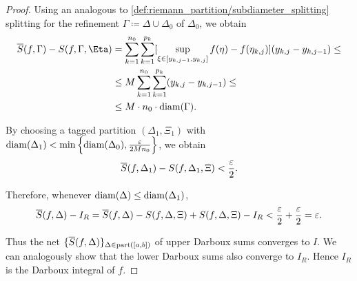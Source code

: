 \begin{proof}
  Using an analogous to \eqref{def:riemann_partition/subdiameter_splitting} splitting for the refinement \( \Gamma \coloneqq \Delta \cup \Delta_0 \) of \( \Delta_0 \), we obtain
  \begin{align*}
    \Ol{S}(f, \Gamma) - S(f, \Gamma, \Eta)
    &=
    \sum_{k=1}^{n_0} \sum_{k=1}^{p_k} [ \sup_{\xi \in [y_{k,j-1}, y_{k,j}]} f(\eta) - f(\eta_{k,j}) ] (y_{k,j} - y_{k,j-1})
    \leq \\ &\leq
    M \sum_{k=1}^{n_0} \sum_{k=1}^{p_k} (y_{k,j} - y_{k,j-1})
    \leq \\ &\leq
    M \cdot n_0 \cdot \Diam(\Gamma).
  \end{align*}

  By choosing a tagged partition \( (\Delta_1, \Xi_1) \) with \( \operatorname{diam}(\Delta_1) < \min \left\{ \operatorname{diam}(\Delta_0), \frac \varepsilon {2 M n_0} \right\} \), we obtain
  \begin{equation*}
    \overline{S}(f, \Delta_1) - S(f, \Delta_1, \Xi) < \frac \varepsilon 2.
  \end{equation*}

  Therefore, whenever \( \operatorname{diam}(\Delta) \leq \operatorname{diam}(\Delta_1) \),
  \begin{equation*}
    \overline{S}(f, \Delta) - I_R
    =
    \overline{S}(f, \Delta) - S(f, \Delta, \Xi) + S(f, \Delta, \Xi) - I_R
    <
    \frac \varepsilon 2 + \frac \varepsilon 2
    =
    \varepsilon.
  \end{equation*}

  Thus the net \( \{ \overline{S}(f, \Delta) \}_{\Delta \in \operatorname{part}([a, b])} \) of upper Darboux sums converges to \( I \). We can analogously show that the lower Darboux sums also converge to \( I_R \). Hence \( I_R \) is the Darboux integral of \( f \).
\end{proof}

